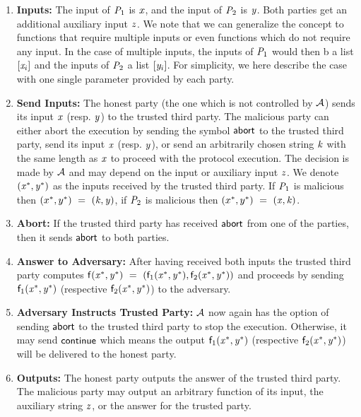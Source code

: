 \begin{enumerate}
    \item \textbf{Inputs:} The input of $\mathit{P}_{1}$ is $\mathit{x}$, and the input of $\mathit{P}_{2}$ is $\mathit{y}$.
    Both parties get an additional auxiliary input $\mathit{z}$.
    We note that we can generalize the concept to functions that require multiple inputs or even functions which do not require any input.
    In the case of multiple inputs, the inputs of $\mathit{P}_{1}$ would then b a list $[\mathit{x}_i]$ and the inputs of $\mathit{P}_{2}$ a list $[\mathit{y}_i]$.
    For simplicity, we here describe the case with one single parameter provided by each party.
    \item \textbf{Send Inputs:} The honest party (the one which is not controlled by $\mathcal{A}$) sends its input $\mathit{x}$ (resp. $\mathit{y}$) to the trusted third party.
    The malicious party can either abort the execution by sending the symbol $\mathsf{abort}$ to the trusted third party, send its input $\mathit{x}$ (resp. $\mathit{y}$), or send an arbitrarily chosen string $\mathit{k}$ with the same length as $\mathit{x}$ to proceed with the protocol execution.
    The decision is made by $\mathcal{A}$ and may depend on the input or auxiliary input $\mathit{z}$.
    We denote $(\mathit{x}^*, \mathit{y}^*)$ as the inputs received by the trusted third party.
    If $\mathit{P}_{1}$ is malicious then $(x^*, y^*) ~=~ (\mathit{k}, \mathit{y})$, if $\mathit{P}_{2}$ is malicious then $(x^*, y^*) ~=~ (\mathit{x}, \mathit{k})$.
    \item \textbf{Abort:} If the trusted third party has received $\mathsf{abort}$ from one of the parties, then it sends $\mathsf{abort}$ to both parties.
    \item \textbf{Answer to Adversary:} After having received both inputs the trusted third party computes $\mathsf{f}(\mathit{x}^*, \mathit{y}^*) ~=~ (\mathsf{f}_1(\mathit{x}^*, \mathit{y}^*), \mathsf{f}_2(\mathit{x}^*, \mathit{y}^*))$ and proceeds by sending $\mathsf{f}_1(\mathit{x}^*, \mathit{y}^*)$ (respective $\mathsf{f}_2(\mathit{x}^*, \mathit{y}^*)$) to the adversary.
    \item \textbf{Adversary Instructs Trusted Party:} $\mathcal{A}$ now again has the option of sending $\mathsf{abort}$ to the trusted third party to stop the execution.
    Otherwise, it may send $\mathsf{continue}$ which means the output $\mathsf{f}_1(\mathit{x}^*, \mathit{y}^*)$ (respective $\mathsf{f}_2(\mathit{x}^*, \mathit{y}^*)$) will be delivered to the honest party.
    \item \textbf{Outputs:} The honest party outputs the answer of the trusted third party. The malicious party may output an arbitrary function of its input, the auxiliary string $\mathit{z}$, or the answer for the trusted party.
\end{enumerate}

